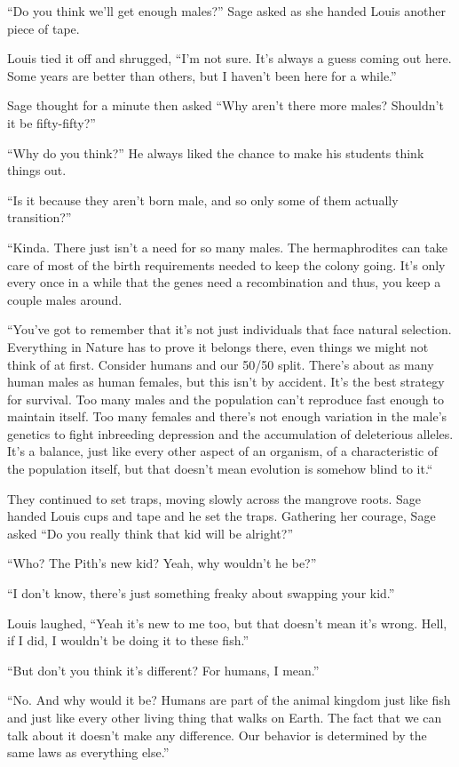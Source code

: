 \documentclass[12pt, fleqn, AofM.tex]{subfiles}
\begin{document}
“Do you think we'll get enough males?” Sage asked as she handed Louis another piece of tape.

Louis tied it off and shrugged, “I'm not sure. It's always a guess coming out here. Some years are better than others, but I haven't been here for a while.”

Sage thought for a minute then asked “Why aren't there more males? Shouldn't it be fifty-fifty?”

“Why do you think?” He always liked the chance to make his students think things out.

“Is it because they aren't born male, and so only some of them actually transition?”

“Kinda. There just isn't a need for so many males. The hermaphrodites can take care of most of the birth requirements needed to keep the colony going. It's only every once in a while that the genes need a recombination and thus, you keep a couple males around.

“You've got to remember that it's not just individuals that face natural selection. Everything in Nature has to prove it belongs there, even things we might not think of at first. Consider humans and our 50/50 split. There's about as many human males as human females, but this isn't by accident. It's the best strategy for survival. Too many males and the population can't reproduce fast enough to maintain itself. Too many females and there's not enough variation in the male's genetics to fight inbreeding depression and the accumulation of deleterious alleles. It's a balance, just like every other aspect of an organism, of a characteristic of the population itself, but that doesn't mean evolution is somehow blind to it.“

They continued to set traps, moving slowly across the mangrove roots. Sage handed Louis cups and tape and he set the traps. Gathering her courage, Sage asked “Do you really think that kid will be alright?”

“Who? The Pith's new kid? Yeah, why wouldn't he be?”

“I don't know, there's just something freaky about swapping your kid.”

Louis laughed, “Yeah it's new to me too, but that doesn't mean it's wrong. Hell, if I did, I wouldn't be doing it to these fish.”

“But don't you think it's different? For humans, I mean.”

“No. And why would it be? Humans are part of the animal kingdom just like fish and just like every other living thing that walks on Earth. The fact that we can talk about it doesn't make any difference. Our behavior is determined by the same laws as everything else.”
\end{document}
